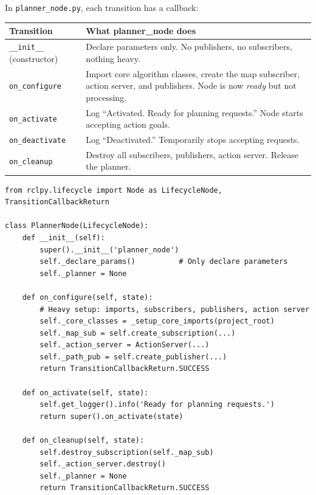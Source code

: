 \documentclass[12pt, a4paper]{article}
\begin{document}
In \texttt{planner\_node.py}, each transition has a callback:

\begin{center}
\begin{tabular}{lp{9cm}}
    \toprule
    \textbf{Transition} & \textbf{What planner\_node does} \\
    \midrule
    \texttt{\_\_init\_\_} (constructor) & Declare parameters only. No publishers, no subscribers, nothing heavy. \\
    \texttt{on\_configure} & Import core algorithm classes, create the map subscriber, action server, and publishers. Node is now \emph{ready} but not processing. \\
    \texttt{on\_activate} & Log ``Activated. Ready for planning requests.'' Node starts accepting action goals. \\
    \texttt{on\_deactivate} & Log ``Deactivated.'' Temporarily stops accepting requests. \\
    \texttt{on\_cleanup} & Destroy all subscribers, publishers, action server. Release the planner. \\
    \bottomrule
\end{tabular}
\end{center}

\begin{lstlisting}[style=python, caption={Lifecycle callbacks (planner\_node.py)}]
from rclpy.lifecycle import Node as LifecycleNode, TransitionCallbackReturn

class PlannerNode(LifecycleNode):
    def __init__(self):
        super().__init__('planner_node')
        self._declare_params()          # Only declare parameters
        self._planner = None

    def on_configure(self, state):
        # Heavy setup: imports, subscribers, publishers, action server
        self._core_classes = _setup_core_imports(project_root)
        self._map_sub = self.create_subscription(...)
        self._action_server = ActionServer(...)
        self._path_pub = self.create_publisher(...)
        return TransitionCallbackReturn.SUCCESS

    def on_activate(self, state):
        self.get_logger().info('Ready for planning requests.')
        return super().on_activate(state)

    def on_cleanup(self, state):
        self.destroy_subscription(self._map_sub)
        self._action_server.destroy()
        self._planner = None
        return TransitionCallbackReturn.SUCCESS
\end{lstlisting}
\end{document}
